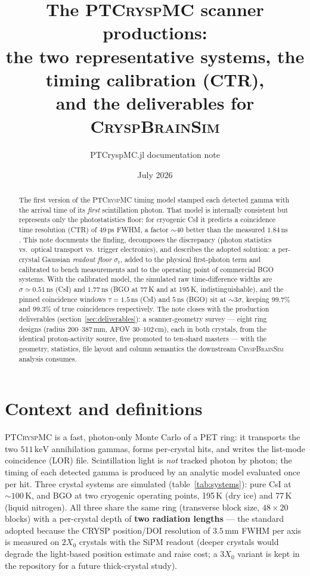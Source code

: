 \documentclass[11pt,a4paper]{article}
\title{The \textsc{PTCryspMC} scanner productions:\\
       the two representative systems, the timing calibration (CTR),\\
       and the deliverables for \textsc{CryspBrainSim}}
\author{PTCryspMC.jl documentation note}
\date{July 2026}
\newcommand{\ns}{\,\mathrm{ns}}
\newcommand{\ps}{\,\mathrm{ps}}
\newcommand{\keV}{\,\mathrm{keV}}
\begin{document}
\maketitle

\begin{abstract}
\noindent
The first version of the \textsc{PTCryspMC} timing model stamped each detected gamma with the
arrival time of its \emph{first} scintillation photon. That model is internally consistent but
represents only the photostatistics floor: for cryogenic CsI it predicts a coincidence time
resolution (CTR) of $49\ps$ FWHM, a factor ${\sim}40$ better than the measured $1.84\ns$
\cite{Soleti2024}. This note documents the finding, decomposes the discrepancy
(photon statistics vs.\ optical transport vs.\ trigger electronics), and describes the adopted
solution: a per-crystal Gaussian \emph{readout floor} $\sigma_t$, added to the physical
first-photon term and calibrated to bench measurements and to the operating point of commercial
BGO systems. With the calibrated model, the simulated raw time-difference widths are
$\sigma \simeq 0.51\ns$ (CsI) and $1.77\ns$ (BGO at 77\,K and at 195\,K, indistinguishable),
and the pinned coincidence windows $\tau = 1.5\ns$ (CsI) and $5\ns$ (BGO) sit at
${\sim}3\sigma$, keeping $99.7\%$ and $99.3\%$ of true coincidences respectively.
The note closes with the production deliverables (section~\ref{sec:deliverables}): a
scanner-geometry survey --- eight ring designs (radius $200$--$387$\,mm, AFOV $30$--$102$\,cm),
each in both crystals, from the identical proton-activity source, five promoted to ten-shard
masters --- with the geometry, statistics, file layout and column semantics the downstream
\textsc{CryspBrainSim} analysis consumes.
\end{abstract}

\section{Context and definitions}

\textsc{PTCryspMC} is a fast, photon-only Monte Carlo of a PET ring: it transports the two
$511\keV$ annihilation gammas, forms per-crystal hits, and writes the list-mode coincidence
(LOR) file. Scintillation light is \emph{not} tracked photon by photon; the timing of each
detected gamma is produced by an analytic model evaluated once per hit. Three crystal systems
are simulated (table~\ref{tab:systems}): pure CsI at ${\sim}100$\,K, and BGO at two cryogenic
operating points, 195\,K (dry ice) and 77\,K (liquid nitrogen). All three share the same ring
(transverse block size, $48\times20$ blocks) with a per-crystal depth of \textbf{two radiation
lengths} --- the standard adopted because the CRYSP position/DOI resolution of
$3.5$\,mm FWHM per axis is measured on $2X_0$ crystals with the SiPM readout (deeper crystals
would degrade the light-based position estimate and raise cost; a $3X_0$ variant is kept in
the repository for a future thick-crystal study).
\end{document}
